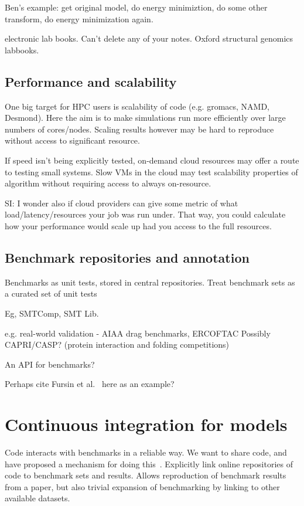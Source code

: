 \documentclass[conference]{IEEEtran}
\begin{document}
Ben's example: get original model, do energy minimiztion, do some other transform, do energy minimization again. 

electronic lab books. Can't delete any of your notes. Oxford structural genomics labbooks. 

\subsection{Performance and scalability}
One big target for HPC users is scalability of code (e.g. gromacs,
NAMD, Desmond). Here the aim is to make simulations run more efficiently
over large numbers of cores/nodes. Scaling results however may be 
hard to reproduce without access to significant resource.

If speed isn't being explicitly tested, on-demand cloud resources 
may offer a route to testing small systems. Slow VMs in the cloud
may test scalability properties of algorithm without requiring access
to always on-resource.

SI: I wonder also if cloud providers can give some metric of what
load/latency/resources your job was run under.  That way, you could
calculate how your performance would scale up had you access to the
full resources. 


\subsection{Benchmark repositories and annotation}
Benchmarks as unit tests, stored in central repositories. 
Treat benchmark sets as a curated set of unit tests

Eg, SMTComp, SMT Lib. 

e.g. real-world validation - AIAA drag benchmarks, ERCOFTAC
	Possibly CAPRI/CASP? (protein interaction and folding competitions)

An API for benchmarks? 

Perhaps cite Fursin et al.~\cite{fursin-et-al:2014} here as an example?


\section{Continuous integration for models}
Code interacts with benchmarks in a reliable way. We want to share
code, and have proposed a mechanism for doing this~\cite{crick-et-al_wssspe2}.
Explicitly link online repositories of code to benchmark sets and
results. Allows reproduction of benchmark results from a paper, 
but also trivial expansion of benchmarking by linking to other 
available datasets.
\end{document}
